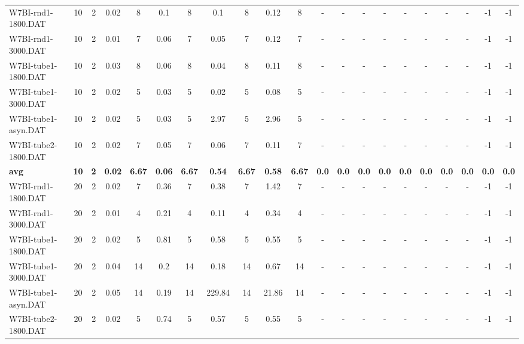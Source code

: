 \begin{sidewaystable}[!ht]
{\begin{tabular}{lcccccccccccccccccccc}
W7BI-rnd1-1800.DAT & 10 & 2 &  \textcolor{blue2}{0.02} & 8 & 0.1 & 8 & 0.1 & 8 & 0.12 & 8 &  - &  - &  - &  - &  - &  - &  - &  - & -1 & -1 \\
W7BI-rnd1-3000.DAT & 10 & 2 &  \textcolor{blue2}{0.01} & 7 & 0.06 & 7 & 0.05 & 7 & 0.12 & 7 &  - &  - &  - &  - &  - &  - &  - &  - & -1 & -1 \\
W7BI-tube1-1800.DAT & 10 & 2 &  \textcolor{blue2}{0.03} & 8 & 0.06 & 8 & 0.04 & 8 & 0.11 & 8 &  - &  - &  - &  - &  - &  - &  - &  - & -1 & -1 \\
W7BI-tube1-3000.DAT & 10 & 2 &  \textcolor{blue2}{0.02} & 5 & 0.03 & 5 &  \textcolor{blue2}{0.02} & 5 & 0.08 & 5 &  - &  - &  - &  - &  - &  - &  - &  - & -1 & -1 \\
W7BI-tube1-asyn.DAT & 10 & 2 &  \textcolor{blue2}{0.02} & 5 & 0.03 & 5 & 2.97 & 5 & 2.96 & 5 &  - &  - &  - &  - &  - &  - &  - &  - & -1 & -1 \\
W7BI-tube2-1800.DAT & 10 & 2 &  \textcolor{blue2}{0.02} & 7 & 0.05 & 7 & 0.06 & 7 & 0.11 & 7 &  - &  - &  - &  - &  - &  - &  - &  - & -1 & -1 \\
\cline{1-21} \textbf{avg} & \textbf{10} & \textbf{2} & \textbf{0.02} & \textbf{6.67} & \textbf{0.06} & \textbf{6.67} & \textbf{0.54} & \textbf{6.67} & \textbf{0.58} & \textbf{6.67} & \textbf{0.0} & \textbf{0.0} & \textbf{0.0} & \textbf{0.0} & \textbf{0.0} & \textbf{0.0} & \textbf{0.0} & \textbf{0.0} & \textbf{0.0} & \textbf{0.0} \\ \cline{1-21}
W7BI-rnd1-1800.DAT & 20 & 2 &  \textcolor{blue2}{0.02} & 7 & 0.36 & 7 & 0.38 & 7 & 1.42 & 7 &  - &  - &  - &  - &  - &  - &  - &  - & -1 & -1 \\
W7BI-rnd1-3000.DAT & 20 & 2 &  \textcolor{blue2}{0.01} & 4 & 0.21 & 4 & 0.11 & 4 & 0.34 & 4 &  - &  - &  - &  - &  - &  - &  - &  - & -1 & -1 \\
W7BI-tube1-1800.DAT & 20 & 2 &  \textcolor{blue2}{0.02} & 5 & 0.81 & 5 & 0.58 & 5 & 0.55 & 5 &  - &  - &  - &  - &  - &  - &  - &  - & -1 & -1 \\
W7BI-tube1-3000.DAT & 20 & 2 &  \textcolor{blue2}{0.04} & 14 & 0.2 & 14 & 0.18 & 14 & 0.67 & 14 &  - &  - &  - &  - &  - &  - &  - &  - & -1 & -1 \\
W7BI-tube1-asyn.DAT & 20 & 2 &  \textcolor{blue2}{0.05} & 14 & 0.19 & 14 & 229.84 & 14 & 21.86 & 14 &  - &  - &  - &  - &  - &  - &  - &  - & -1 & -1 \\
W7BI-tube2-1800.DAT & 20 & 2 &  \textcolor{blue2}{0.02} & 5 & 0.74 & 5 & 0.57 & 5 & 0.55 & 5 &  - &  - &  - &  - &  - &  - &  - &  - & -1 & -1 \\

\end{tabular}}
\end{sidewaystable}
